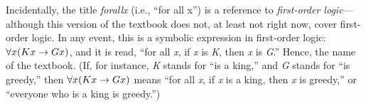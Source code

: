 Incidentally, the title \textit{forall\hspace{.10em}x} (i.e., ``for all x'') is a reference to \textit{first-order logic}---although this version of the textbook does not, at least not right now, cover first-order logic. In any event, this is a symbolic expression in first-order logic: $\forall x(Kx \rightarrow Gx)$, and it is read, “for all \textit{x}, if \textit{x} is \textit{K}, then \textit{x} is \textit{G}.” Hence, the name of the textbook. (If, for instance, \textit{K} stands for ``is a king,'' and \textit{G} stands for ``is greedy,'' then $\forall x(Kx \rightarrow Gx)$ means ``for all \textit{x}, if \textit{x} is a king, then \textit{x} is greedy,'' or ``everyone who is a king is greedy.'') 